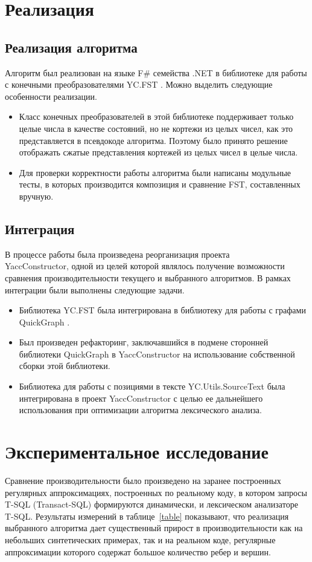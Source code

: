 \section{Реализация}
\subsection{Реализация алгоритма}
Алгоритм был реализован на языке F\# семейства .NET в библиотеке для работы с конечными преобразователями YC.FST \cite{polubelova}. Можно выделить следующие особенности реализации.
\begin{itemize}
\item Класс конечных преобразователей в этой библиотеке поддерживает только целые числа в качестве состояний, но не кортежи из целых чисел, как это представляется в псевдокоде алгоритма. Поэтому было принято решение отображать сжатые представления кортежей из целых чисел в целые числа.
\item Для проверки корректности работы алгоритма были написаны модульные тесты, в которых производится композиция и сравнение FST, составленных вручную.
\end{itemize} 


\subsection{Интеграция}
В процессе работы была произведена реорганизация проекта\\ YaccConstructor, одной из целей которой являлось получение возможности сравнения производительности текущего и выбранного алгоритмов. В рамках интеграции были выполнены следующие задачи.

\begin{itemize}
\item Библиотека YC.FST была интегрирована в библиотеку для работы с графами QuickGraph \cite{quick_graph}.
\item Был произведен рефакторинг, заключавшийся в подмене сторонней библиотеки QuickGraph в YaccConstructor на использование собственной сборки этой библиотеки.
\item Библиотека для работы с позициями в тексте YC.Utils.SourceText \cite{source_text} была интегрирована в проект YaccConstructor с целью ее дальнейшего использования при оптимизации алгоритма лексического анализа.
\end{itemize} 

\section{Экспериментальное исследование}
Сравнение производительности было произведено на заранее построенных регулярных аппроксимациях, построенных по реальному коду, в котором запросы T-SQL (Transact-SQL) формируются динамически, и лексическом анализаторе T-SQL. Результаты измерений в таблице~\ref{table} показывают, что реализация выбранного алгоритма дает существенный прирост в производительности как на небольших синтетических примерах, так и на реальном коде, регулярные аппроксимации которого содержат большое количество ребер и вершин.


